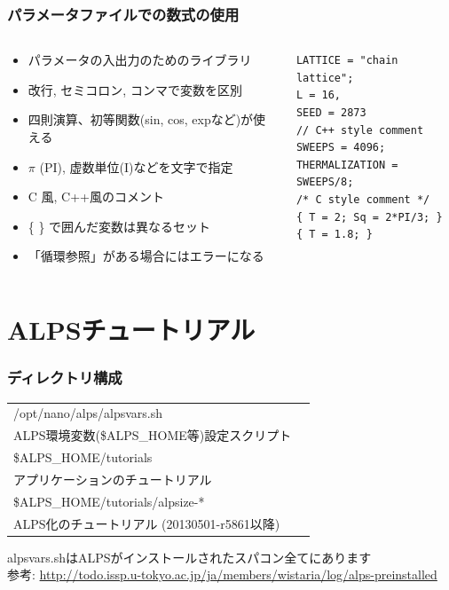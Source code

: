\begin{frame}[t,fragile]
  \frametitle{パラメータファイルでの数式の使用}
  \begin{columns}[T]
    \begin{column}{.5\textwidth}
      \begin{itemize}
      \item パラメータの入出力のためのライブラリ
        \item 改行, セミコロン, コンマで変数を区別
        \item 四則演算、初等関数(sin, cos, expなど)が使える
        \item $\pi$ (PI), 虚数単位(I)などを文字で指定
        \item C 風, C++風のコメント
        \item \{ \} で囲んだ変数は異なるセット
        \item 「循環参照」がある場合にはエラーになる
      \end{itemize}
    \end{column}
    \begin{column}{.5\textwidth}
    \begin{lstlisting}
LATTICE = "chain lattice";
L = 16,
SEED = 2873
// C++ style comment
SWEEPS = 4096;
THERMALIZATION = SWEEPS/8;
/* C style comment */
{ T = 2; Sq = 2*PI/3; }
{ T = 1.8; }
    \end{lstlisting}
    \end{column}
  \end{columns}
\end{frame}

\section{ALPSチュートリアル}

\begin{frame}
  \frametitle{ディレクトリ構成}
  \begin{tabular}{ll}
    /opt/nano/alps/alpsvars.sh & \\
    \hspace*{3em} ALPS環境変数(\$ALPS\_HOME等)設定スクリプト \\
    \$ALPS\_HOME/tutorials & \\
    \hspace*{3em} アプリケーションのチュートリアル \\
    \$ALPS\_HOME/tutorials/alpsize-* & \\
    \hspace*{3em} ALPS化のチュートリアル (20130501-r5861以降)
  \end{tabular}
  \begin{alertblock}{}
    alpsvars.shはALPSがインストールされたスパコン全てにあります \\
    参考: {\footnotesize \url{http://todo.issp.u-tokyo.ac.jp/ja/members/wistaria/log/alps-preinstalled}}
\end{alertblock}
\end{frame}

